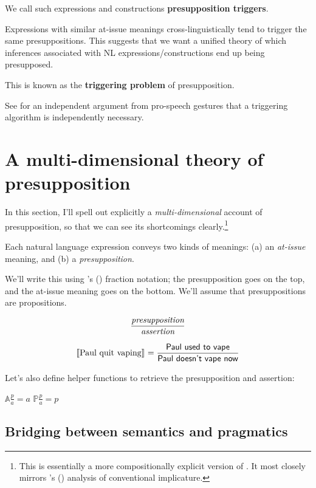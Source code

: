\documentclass[cronos,landscape,paper=letter]{ling-handout}
\begin{document}
We call such expressions and constructions \textbf{presupposition triggers}.

Expressions with similar at-issue meanings cross-linguistically tend to trigger the same presuppositions. This suggests that we want a unified theory of which inferences associated with NL expressions/constructions end up being presupposed.

This is known as the \textbf{triggering problem} of presupposition.

See \citet{schlenker2019} for an independent argument from pro-speech gestures that a triggering algorithm is independently necessary.





\section{A multi-dimensional theory of presupposition}

In this section, I'll spell out explicitly a \textit{multi-dimensional} account of presupposition, so that we can see its shortcomings clearly.\footnote{This is essentially a more compositionally explicit version of \citet{karttunenPeters1979}. It most closely mirrors \citeauthor{asudehGiorgolo2012}'s (\citeyear{asudehGiorgolo2012}) analysis of conventional implicature.}

Each natural language expression conveys two kinds of meanings: (a) an \textit{at-issue} meaning, and (b) a \textit{presupposition}.

We'll write this using \citeauthor{sauerland_2008}'s (\citeyear{sauerland_2008}) fraction notation; the presupposition goes on the top, and the at-issue meaning goes on the bottom. We'll assume that presuppositions are propositions.

\[\displaystyle\frac{\text{\it presupposition}}{\text{\it assertion}}\]

\[\eval{Paul quit vaping}= \displaystyle\frac{\ml{Paul used to vape}}{\ml{Paul doesn't vape now}}\]

Let's also define helper functions to retrieve the presupposition and assertion:

\begin{multicols}{2}
\ex
\(𝔸 \displaystyle\frac{p}{a} = a\)
\xe
\columnbreak
\ex
\(ℙ \displaystyle\frac{p}{a} = p\)
\xe
\end{multicols}

\subsection{Bridging between semantics and pragmatics}
\end{document}
